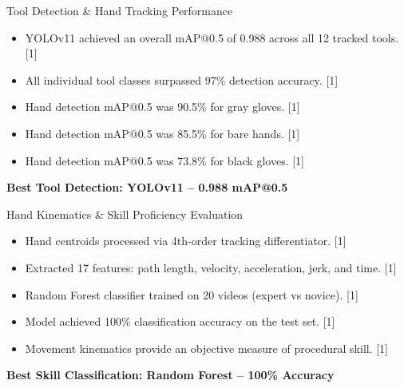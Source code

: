\documentclass[aspectratio=169, 10pt]{beamer}
\begin{document}
\begin{frame}{Tool Detection \& Hand Tracking Performance}
    \vspace{0.25cm}
    \begin{itemize}
        \setlength{\itemsep}{7pt}
        \item YOLOv11 achieved an overall mAP@0.5 of 0.988 across all 12 tracked tools. [1]
        \item All individual tool classes surpassed 97\% detection accuracy. [1]
        \item Hand detection mAP@0.5 was 90.5\% for gray gloves. [1]
        \item Hand detection mAP@0.5 was 85.5\% for bare hands. [1]
        \item Hand detection mAP@0.5 was 73.8\% for black gloves. [1]
    \end{itemize}

    \vspace{0.2cm}
    \centering
    \textbf{Best Tool Detection: YOLOv11 – 0.988 mAP@0.5}
\end{frame}

\begin{frame}{Hand Kinematics \& Skill Proficiency Evaluation}
    \vspace{0.25cm}
    \begin{itemize}
        \setlength{\itemsep}{7pt}
        \item Hand centroids processed via 4th-order tracking differentiator. [1]
        \item Extracted 17 features: path length, velocity, acceleration, jerk, and time. [1]
        \item Random Forest classifier trained on 20 videos (expert vs novice). [1]
        \item Model achieved 100\% classification accuracy on the test set. [1]
        \item Movement kinematics provide an objective measure of procedural skill. [1]
    \end{itemize}

    \vspace{0.2cm}
    \centering
    \textbf{Best Skill Classification: Random Forest – 100\% Accuracy}
\end{frame}
\end{document}
